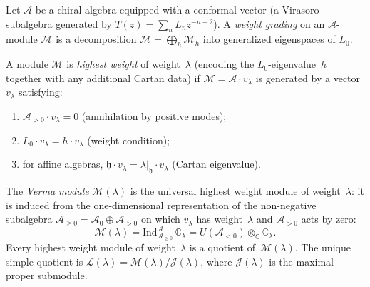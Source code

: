 \begin{definition}
\label{def:highest-weight-module}
Let $\mathcal{A}$ be a chiral algebra equipped with a conformal vector
(a Virasoro subalgebra generated by $T(z) = \sum_{n} L_n z^{-n-2}$).
A \emph{weight grading} on an $\mathcal{A}$-module $\mathcal{M}$ is a
decomposition $\mathcal{M} = \bigoplus_{h} \mathcal{M}_h$ into
generalized eigenspaces of $L_0$.

A module $\mathcal{M}$ is \emph{highest weight} of weight~$\lambda$
(encoding the $L_0$-eigenvalue~$h$ together with any additional Cartan
data) if $\mathcal{M} = \mathcal{A} \cdot v_\lambda$ is generated by a
vector $v_\lambda$ satisfying:
\begin{enumerate}[label=(\roman*)]
\item $\mathcal{A}_{>0} \cdot v_\lambda = 0$ (annihilation by
   positive modes);
\item $L_0 \cdot v_\lambda = h \cdot v_\lambda$ (weight condition);
\item for affine algebras, $\mathfrak{h} \cdot v_\lambda = \lambda|_\mathfrak{h} \cdot v_\lambda$
   (Cartan eigenvalue).
\end{enumerate}
\end{definition}

\begin{definition}\label{def:verma-module}
The \emph{Verma module} $\mathcal{M}(\lambda)$ is the universal highest
weight module of weight~$\lambda$: it is induced from the one-dimensional
representation of the non-negative subalgebra
$\mathcal{A}_{\geq 0} = \mathcal{A}_0 \oplus \mathcal{A}_{>0}$ on which
$v_\lambda$ has weight~$\lambda$ and $\mathcal{A}_{>0}$ acts by zero:
\[
\mathcal{M}(\lambda)
= \mathrm{Ind}_{\mathcal{A}_{\geq 0}}^{\mathcal{A}}\,\mathbb{C}_\lambda
= U(\mathcal{A}_{<0}) \otimes_\mathbb{C} \mathbb{C}_\lambda.
\]
Every highest weight module of weight~$\lambda$ is a quotient
of~$\mathcal{M}(\lambda)$.  The unique simple quotient is
$\mathcal{L}(\lambda) = \mathcal{M}(\lambda) / \mathcal{J}(\lambda)$,
where $\mathcal{J}(\lambda)$ is the maximal proper submodule.
\end{definition}

